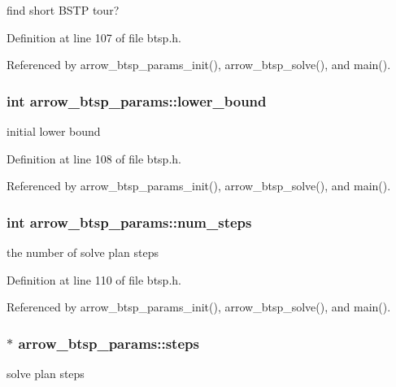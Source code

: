find short BSTP tour? 

Definition at line 107 of file btsp.h.

Referenced by arrow\_\-btsp\_\-params\_\-init(), arrow\_\-btsp\_\-solve(), and main().\hypertarget{structarrow__btsp__params_da747e3797f9327834e4dbb1459d2786}{
\subsubsection[{lower\_\-bound}]{\setlength{\rightskip}{0pt plus 5cm}int {\bf arrow\_\-btsp\_\-params::lower\_\-bound}}}
\label{structarrow__btsp__params_da747e3797f9327834e4dbb1459d2786}


initial lower bound 

Definition at line 108 of file btsp.h.

Referenced by arrow\_\-btsp\_\-params\_\-init(), arrow\_\-btsp\_\-solve(), and main().\hypertarget{structarrow__btsp__params_2897d24f2fdd53c723609cf68880f55e}{
\subsubsection[{num\_\-steps}]{\setlength{\rightskip}{0pt plus 5cm}int {\bf arrow\_\-btsp\_\-params::num\_\-steps}}}
\label{structarrow__btsp__params_2897d24f2fdd53c723609cf68880f55e}


the number of solve plan steps 

Definition at line 110 of file btsp.h.

Referenced by arrow\_\-btsp\_\-params\_\-init(), arrow\_\-btsp\_\-solve(), and main().\hypertarget{structarrow__btsp__params_49aedb95b2fc4a725e3bb8485470484b}{
\subsubsection[{steps}]{$\ast$ {\bf arrow\_\-btsp\_\-params::steps}}}
\label{structarrow__btsp__params_49aedb95b2fc4a725e3bb8485470484b}


solve plan steps 

